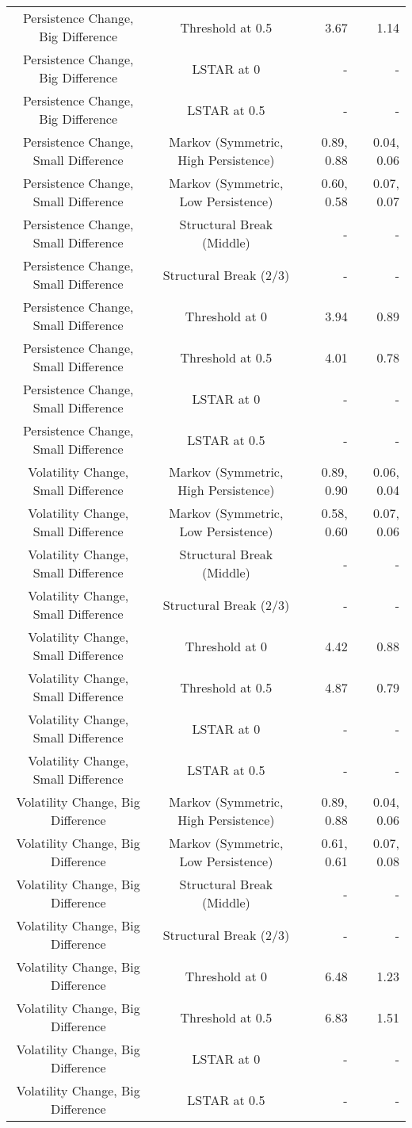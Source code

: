 \begin{table}[t]
\begin{tabular*}{\linewidth}{@{\extracolsep{\fill}}ccrr}
Persistence Change, Big Difference & Threshold at 0.5 & 3.67 & 1.14 \\ 
Persistence Change, Big Difference & LSTAR at 0 & - & - \\ 
Persistence Change, Big Difference & LSTAR at 0.5 & - & - \\ 
Persistence Change, Small Difference & Markov (Symmetric, High Persistence) & 0.89, 0.88 & 0.04, 0.06 \\ 
Persistence Change, Small Difference & Markov (Symmetric, Low Persistence) & 0.60, 0.58 & 0.07, 0.07 \\ 
Persistence Change, Small Difference & Structural Break (Middle) & - & - \\ 
Persistence Change, Small Difference & Structural Break (2/3) & - & - \\ 
Persistence Change, Small Difference & Threshold at 0 & 3.94 & 0.89 \\ 
Persistence Change, Small Difference & Threshold at 0.5 & 4.01 & 0.78 \\ 
Persistence Change, Small Difference & LSTAR at 0 & - & - \\ 
Persistence Change, Small Difference & LSTAR at 0.5 & - & - \\ 
Volatility Change, Small Difference & Markov (Symmetric, High Persistence) & 0.89, 0.90 & 0.06, 0.04 \\ 
Volatility Change, Small Difference & Markov (Symmetric, Low Persistence) & 0.58, 0.60 & 0.07, 0.06 \\ 
Volatility Change, Small Difference & Structural Break (Middle) & - & - \\ 
Volatility Change, Small Difference & Structural Break (2/3) & - & - \\ 
Volatility Change, Small Difference & Threshold at 0 & 4.42 & 0.88 \\ 
Volatility Change, Small Difference & Threshold at 0.5 & 4.87 & 0.79 \\ 
Volatility Change, Small Difference & LSTAR at 0 & - & - \\ 
Volatility Change, Small Difference & LSTAR at 0.5 & - & - \\ 
Volatility Change, Big Difference & Markov (Symmetric, High Persistence) & 0.89, 0.88 & 0.04, 0.06 \\ 
Volatility Change, Big Difference & Markov (Symmetric, Low Persistence) & 0.61, 0.61 & 0.07, 0.08 \\ 
Volatility Change, Big Difference & Structural Break (Middle) & - & - \\ 
Volatility Change, Big Difference & Structural Break (2/3) & - & - \\ 
Volatility Change, Big Difference & Threshold at 0 & 6.48 & 1.23 \\ 
Volatility Change, Big Difference & Threshold at 0.5 & 6.83 & 1.51 \\ 
Volatility Change, Big Difference & LSTAR at 0 & - & - \\ 
Volatility Change, Big Difference & LSTAR at 0.5 & - & - \\ 
\bottomrule
\end{tabular*}
\end{table}
